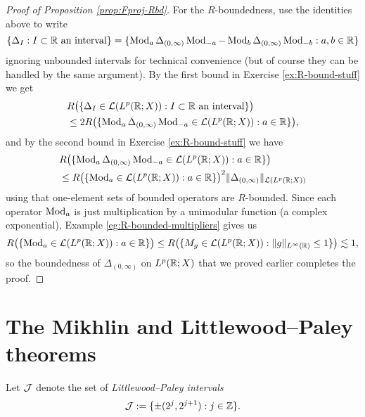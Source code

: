 \begin{proof}[Proof of Proposition \ref{prop:Fproj-Rbd}]
  For the $R$-boundedness, use the identities above to write
  \begin{equation*}
    \{\Delta_{I} : \text{$I \subset \mathbb{R}$ an interval}\}
    = \{\operatorname{Mod}_{a} \Delta_{(0,\infty)} \operatorname{Mod}_{-a} - \operatorname{Mod}_{b} \Delta_{(0,\infty)} \operatorname{Mod}_{-b} : a,b \in \mathbb{R}\} 
  \end{equation*}
  ignoring unbounded intervals for technical convenience (but of course they can be handled by the same argument).
  By the first bound in Exercise \eqref{ex:R-bound-stuff} we get
  \begin{equation*}
    \begin{aligned}
      &R\big( \{\Delta_{I} \in \mathcal{L}(L^p(\mathbb{R};X)) : \text{$I \subset \mathbb{R}$ an interval}\} \big) \\
      &\leq 2R\big( \{\operatorname{Mod}_{a} \Delta_{(0,\infty)} \operatorname{Mod}_{-a} \in \mathcal{L}(L^p(\mathbb{R};X)) : a \in \mathbb{R}\}  \big),
  \end{aligned}
  \end{equation*}
  and by the second bound in Exercise \eqref{ex:R-bound-stuff} we have
  \begin{equation*}
    \begin{aligned}
      &R\big( \{\operatorname{Mod}_{a} \Delta_{(0,\infty)} \operatorname{Mod}_{-a} \in \mathcal{L}(L^p(\mathbb{R};X)) : a \in \mathbb{R}\}  \big) \\
      &\leq R\big( \{ \operatorname{Mod}_{a} \in \mathcal{L}(L^p(\mathbb{R};X)) : a \in \mathbb{R} \} \big)^{2} \|\Delta_{(0,\infty)}\|_{\mathcal{L}(L^p(\mathbb{R};X))}
    \end{aligned}
  \end{equation*}
  using that one-element sets of bounded operators are $R$-bounded.
  Since each operator $\operatorname{Mod}_{a}$ is just multiplication by a unimodular function (a complex exponential), Example \eqref{eg:R-bounded-multipliers} gives us
  \begin{equation*}
    R\big( \{ \operatorname{Mod}_{a} \in \mathcal{L}(L^p(\mathbb{R};X)) : a \in \mathbb{R} \} \big)
    \leq R\big( \{ M_{g} \in \mathcal{L}(L^p(\mathbb{R};X))  : \|g\|_{L^\infty(\mathbb{R})} \leq 1\} \big) \lesssim 1,
\end{equation*}
so the boundedness of $\Delta_{(0,\infty)}$ on $L^p(\mathbb{R};X)$ that we proved earlier completes the proof.
\end{proof}



\section{The Mikhlin and Littlewood--Paley theorems}

Let $\mathcal{J}$ denote the set of \emph{Littlewood--Paley intervals}
\begin{equation*}
  \mathcal{J} := \{\pm(2^{j}, 2^{j+1}) : j \in \mathbb{Z}\}.
\end{equation*}

